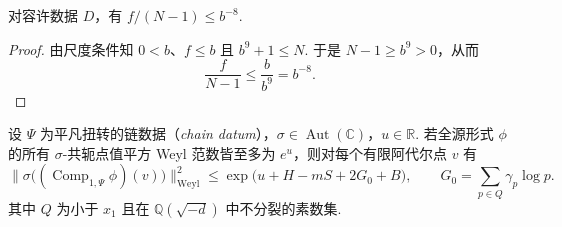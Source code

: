 \begin{lemma}[分歧子空间余维数的尺度界]
\label{lem:a-ramified-loss-scale}
\emitthmsource
对容许数据 $D$，有 $f/(N-1)\le b^{-8}$.
\end{lemma}
\begin{proof}
由尺度条件知 $0<b$、$f\le b$ 且 $b^9+1\le N$. 于是 $N-1\ge b^9>0$，从而
\[
 \frac{f}{N-1}\le\frac{b}{b^9}=b^{-8}.
\]
\end{proof}

\begin{lemma}[复合提升的无穷位大小]
\label{lem:a-composite-size}
\emitthmsource
设 $\Psi$ 为平凡扭转的链数据（\emph{chain datum}），$\sigma\in\operatorname{Aut}(\mathbb C)$，$u\in\mathbb R$. 若全源形式 $\phi$ 的所有 $\sigma$-共轭点值平方 Weyl 范数皆至多为 $e^u$，则对每个有限阿代尔点 $v$ 有
\[
 \bigl\|\sigma\bigl((\operatorname{Comp}_{1,\Psi}\phi)(v)\bigr)
 \bigr\|^2_{\mathrm{Weyl}}
 \le \exp\bigl(u+H-mS+2G_0+B\bigr),
 \qquad
 G_0=\sum_{p\in Q}\gamma_p\log p .
\]
其中 $Q$ 为小于 $x_1$ 且在 $\mathbb Q(\sqrt{-d})$ 中不分裂的素数集.
\end{lemma}
